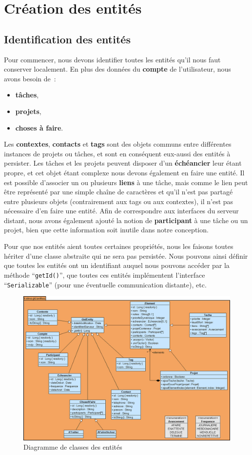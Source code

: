 \documentclass[a4paper, french, 11pt]{report}
\begin{document}
\section{Création des entités}

\subsection{Identification des entités}
Pour commencer, nous devons identifier toutes les entités qu'il nous faut conserver localement.
En plus des données du \textbf{compte} de l'utilisateur, nous avons besoin de~:
\begin{itemize}
\item \textbf{tâches},
\item \textbf{projets},
\item \textbf{choses à faire}.
\end{itemize}
Les \textbf{contextes}, \textbf{contacts} et \textbf{tags} sont des objets communs entre différentes instances de projets ou tâches, et sont en conséquent eux-aussi des entités à persister.
Les tâches et les projets peuvent disposer d'un \textbf{échéancier} leur étant propre, et cet objet étant complexe nous devons également en faire une entité.
Il est possible d'associer un ou plusieurs \textbf{liens} à une tâche, mais comme le lien peut être représenté par une simple chaîne de caractères et qu'il n'est pas partagé entre plusieurs objets (contrairement aux tags ou aux contextes), il n'est pas nécessaire d'en faire une entité.
Afin de correspondre aux interfaces du serveur distant, nous avons également ajouté la notion de \textbf{participant} à une tâche ou un projet, bien que cette information soit inutile dans notre conception.

Pour que nos entités aient toutes certaines propriétés, nous les faisons toutes hériter d'une classe abstraite qui ne sera pas persistée.
Nous pouvons ainsi définir que toutes les entités ont un identifiant auquel nous pouvons accéder par la méthode ``\texttt{getId()}'', que toutes ces entités implémentent l'interface ``\texttt{Serializable}'' (pour une éventuelle communication distante), etc.

\begin{figure}[!ht]
\begin{center}
\includegraphics[width=12cm]{diagramme.png}
\caption{Diagramme de classes des entités}
\label{diagclasses}
\end{center}
\end{figure}
\end{document}
